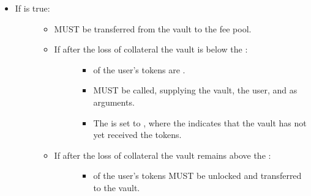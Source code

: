 \documentclass[a4paper,10pt,english]{sphinxmanual}
\begin{document}
\begin{itemize}
\begin{description}
\end{description}

\item {} \begin{description}
\item[{If  is true:}] \leavevmode\begin{itemize}
\item {} 
 MUST be transferred from the vault to the fee pool.

\item {} \begin{description}
\item[{If after the loss of collateral the vault is below the {\hyperref[\detokenize{spec/vault-registry:securecollateralthreshold}]{}}:}] \leavevmode\begin{itemize}
\item {} 
 of the user’s tokens are .

\item {} 
{\hyperref[\detokenize{spec/vault-registry:decreasetokens}]{}} MUST be called, supplying the vault, the user, and  as arguments.

\item {} 
The  is set to , where the  indicates that the vault has not yet received the tokens.

\end{itemize}

\end{description}

\item {} \begin{description}
\item[{If after the loss of collateral the vault remains above the {\hyperref[\detokenize{spec/vault-registry:securecollateralthreshold}]{}}:}] \leavevmode\begin{itemize}
\item {} 
 of the user’s tokens MUST be unlocked and transferred to the vault.


\end{itemize}
\end{description}
\end{itemize}
\end{description}
\end{itemize}
\end{document}
